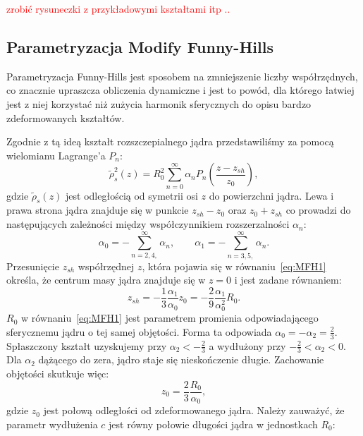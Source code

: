 \documentclass[polish]{article}
\numberwithin{equation}{section}
\begin{document}
\bigskip
\textcolor{red}{zrobić rysuneczki z przykładowymi kształtami itp ..}


\subsection{Parametryzacja Modify Funny-Hills}

Parametryzacja Funny-Hills jest sposobem na zmniejszenie liczby współrzędnych, co znacznie upraszcza obliczenia dynamiczne i jest to powód, dla którego łatwiej jest z niej korzystać niż zużycia harmonik sferycznych do opisu bardzo zdeformowanych kształtów.

Zgodnie z tą ideą kształt rozszczepialnego jądra przedstawiliśmy za pomocą wielomianu Lagrange'a $P_{n}$:
\begin{equation} \label{eq:MFH1}
\tilde{\rho}^{2}_{s}(z)=R_{0}^{2}\sum_{n=0}^{\infty}\alpha_{n}P_{n}\left(\frac{z-z_{sh}}{z_{0}}\right),
\end{equation}
gdzie $\tilde{\rho}_{s}(z)$ jest odległością od symetrii osi $z$ do powierzchni jądra. Lewa i prawa strona jądra znajduje się w punkcie $z_{sh}-z_{0}$ oraz $z_{0}+z_{sh}$ co prowadzi do następujących zależności między współczynnikiem rozszerzalności $\alpha_{n}$:
\begin{equation} \label{eq:MFH2}
\alpha_{0}=-\sum_{n=2,4,}^{\infty}\alpha_{n}, \qquad \alpha_{1}=-\sum_{n=3,5,}^{\infty}\alpha_{n}.
\end{equation}
Przesunięcie $z_{sh}$ współrzędnej $z$, która pojawia się w równaniu~\ref{eq:MFH1} określa, że centrum masy jądra znajduje się w $z=0$ i jest zadane równaniem:
\begin{equation} \label{eq:MFH3}
z_{sh}=-\frac{1}{3}\frac{\alpha_{1}}{\alpha_{0}}z_{0}=-\frac{2}{9}\frac{\alpha_{1}}{\alpha_{0}^{2}}R_{0}.
\end{equation}
$R_{0}$ w równaniu~\ref{eq:MFH1} jest parametrem promienia odpowiadającego sferycznemu jądru o tej samej objętości. Forma ta odpowiada $\alpha_{0}=-\alpha_{2}=\frac{2}{3}$. Spłaszczony kształt uzyskujemy przy $\alpha_{2}<-\frac{2}{3}$ a wydłużony przy $-\frac{2}{3}<\alpha_{2}<0$. Dla $\alpha_{2}$ dążącego do zera, jądro staje się nieskończenie długie. Zachowanie objętości skutkuje więc:
\begin{equation} \label{eq:MFH4}
z_{0}=\frac{2}{3}\frac{R_{0}}{\alpha_{0}},
\end{equation}
gdzie $z_{0}$ jest połową odległości od zdeformowanego jądra. Należy zauważyć, że parametr wydłużenia $c$ jest równy połowie długości jądra w jednostkach $R_{0}$:
\end{document}
